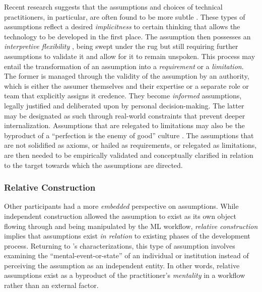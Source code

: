 Recent research suggests that the assumptions and choices of technical practitioners, in particular, are often found to be more subtle \cite{kery2019towards,kommiya2024towards,wang2019data}. These types of assumptions reflect a desired \textit{implicitness} to certain thinking that allows the technology to be developed in the first place. The assumption then possesses an \textit{interpretive flexibility} \cite{meyer2006three,star1989structure,leigh2010not}, being swept under the rug but still requiring further assumptions to validate it and allow for it to remain unspoken. This process may entail the transformation of an assumption into a \textit{requirement} or a \textit{limitation}. The former is managed through the validity of the assumption by an authority, which is either the assumer themselves and their expertise or a separate role or team that explicitly assigns it credence. They become \textit{informed} assumptions, legally justified and deliberated upon by personal decision-making. The latter may be designated as such through real-world constraints that prevent deeper internalization. Assumptions that are relegated to limitations may also be the byproduct of a ``perfection is the enemy of good'' culture \cite{sylvester2018applied,green2019good}. The assumptions that are not solidified as axioms, or hailed as requirements, or relegated as limitations, are then needed to be empirically validated and conceptually clarified in relation to the target towards which the assumptions are directed.



\subsubsection{Relative Construction}
\label{subsec:rel}
Other participants had a more \textit{embedded} perspective on assumptions. While independent construction allowed the assumption to exist as its own object flowing through and being manipulated by the ML workflow, \textit{relative construction} implies that assumptions exist \textit{in relation} to existing phases of the development process. Returning to \citet{delin1994assumption}'s characterizations, this type of assumption involves examining the ``mental-event-or-state'' of an individual or institution instead of perceiving the assumption as an independent entity. In other words, relative assumptions exist as a byproduct of the practitioner's \textit{mentality} in a workflow rather than an external factor.

